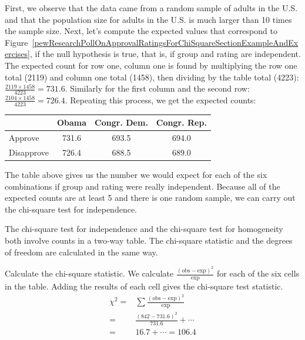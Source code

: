 \begin{examplewrap}
\begin{nexample}{First, we observe that the data came from a random sample of adults in the U.S. and that the population size for adults in the U.S. is much larger than 10 times the sample size.  Next, let's compute the expected values that correspond to Figure~\ref{pewResearchPollOnApprovalRatingsForChiSquareSectionExampleAndExercises}, if the null hypothesis is true, that is, if group and rating are independent.  }
The expected count for row one, column one is found by multiplying the row one total (2119) and column one total (1458), then dividing by the table total (4223): $\frac{2119\times 1458}{4223} = 731.6$. Similarly for the first column and the second row: $\frac{2104\times 1458}{4223} = 726.4$. Repeating this process, we get the expected counts:  
\begin{center}
\begin{tabular}{l ccc}
&Obama  &Congr. Dem. & Congr. Rep. \\
\hline
Approve				    & 731.6    & 693.5 & 694.0   \\
Disapprove			    & 726.4    & 688.5 & 689.0  \\
\hline
\end{tabular}
\end{center}

\end{nexample}
\end{examplewrap}


The table above gives us the number we would expect for each of the six combinations if group and rating were really independent.  Because all of the expected counts are at least 5 and there is one random sample, we can carry out the chi-square test for independence.  



The chi-square test for independence and the chi-square test for homogeneity both involve counts in a two-way table.  The chi-square statistic and the degrees of freedom are calculated in the same way.  

\begin{examplewrap}
\begin{nexample}{Calculate the chi-square statistic.}
We calculate $\frac{(\text{obs} - \text{exp})^2}{\text{exp}}$ for each of the six cells in the table. Adding the results of each cell gives the chi-square test statistic.
\begin{align*}
\chi^2 =& \sum{\frac{(\text{obs} - \text{exp})^2}{\text{exp}}}\\
=& \frac{(842-731.6)^2}{731.6} +\cdots \\
=& 16.7 + \cdots  = 106.4
\end{align*}
\end{nexample}
\end{examplewrap}


